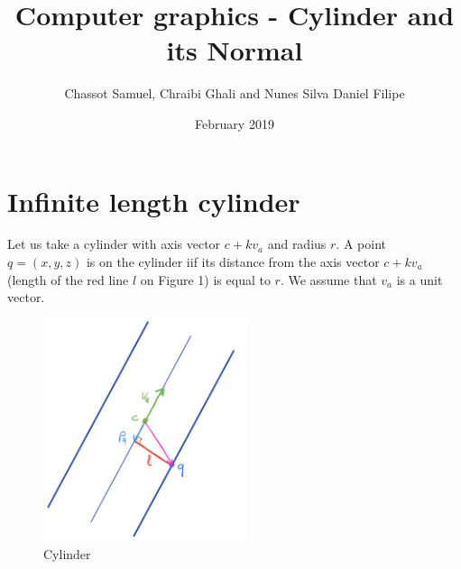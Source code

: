 \documentclass{article}
\title{Computer graphics - Cylinder and its Normal}
\author{Chassot Samuel, Chraibi Ghali and Nunes Silva Daniel Filipe}
\date{February 2019}
\begin{document}
\maketitle

\section{Infinite length cylinder}
Let us take a cylinder with axis vector $c + \textit{k} v_a$ and radius $\textit{r}$. A point $q = (x,y,z)$ is on the cylinder iif its distance from the axis vector $c + \textit{k} v_a$ (length of the red line $l$ on Figure 1) is equal to $\textit{r}$. We assume that $v_a$ is a unit vector.

\begin{figure}[h]
\centering
\includegraphics[width=6cm]{res/Cylinder_sketch.jpeg}
\caption{Cylinder}
\end{figure}
\end{document}
